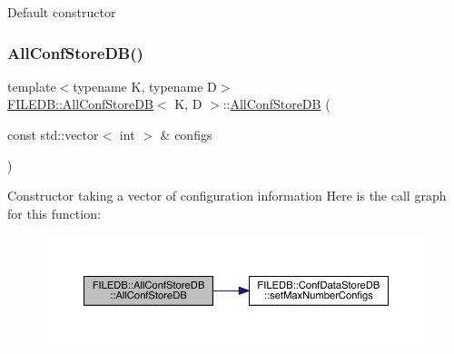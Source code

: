 Default constructor \mbox{\label{classFILEDB_1_1AllConfStoreDB_a9a8553b0ce3ac82be098130d08f62162}} 
\subsubsection{\texorpdfstring{AllConfStoreDB()}{AllConfStoreDB()}\hspace{0.1cm}{\footnotesize\ttfamily [2/6]}}
{\footnotesize\ttfamily template$<$typename K, typename D$>$ \\
\mbox{\hyperlink{classFILEDB_1_1AllConfStoreDB}{F\+I\+L\+E\+D\+B\+::\+All\+Conf\+Store\+DB}}$<$ K, D $>$\+::\mbox{\hyperlink{classFILEDB_1_1AllConfStoreDB}{All\+Conf\+Store\+DB}} (\begin{DoxyParamCaption}\item[{const std\+::vector$<$ int $>$ \&}]{configs }\end{DoxyParamCaption})\hspace{0.3cm}{\ttfamily [inline]}}

Constructor taking a vector of configuration information Here is the call graph for this function\+:
\nopagebreak
\begin{figure}[H]
\begin{center}
\leavevmode
\includegraphics[width=350pt]{df/db6/classFILEDB_1_1AllConfStoreDB_a9a8553b0ce3ac82be098130d08f62162_cgraph}
\end{center}
\end{figure}
\mbox{\label{classFILEDB_1_1AllConfStoreDB_ab8b213578395f0ac7d436a82f4a26fe1}} 
